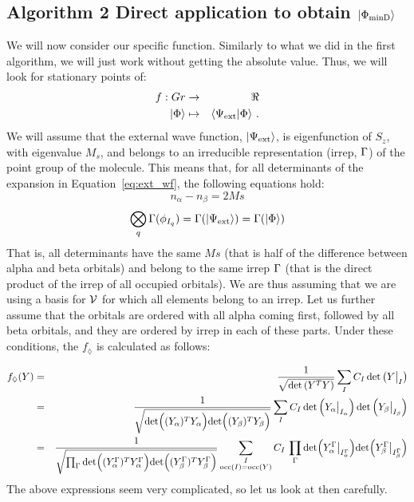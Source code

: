 \subsection{\textsf{\LARGE Algorithm 2}
  Direct application to obtain $\ket{\Phi_\text{minD}}$}
\label{sec:alg_two}

We will now consider our specific function.
Similarly to what we did in the first algorithm, we will just work without getting the absolute value.
Thus, we will look for stationary points of:
\begin{eqnarray}
  f : Gr &\to& \real\\
  \ket{\Phi} &\mapsto& \innerproduct{\Psi_\text{ext}}{\Phi}\,.
\end{eqnarray}
We will assume that the external wave function, $\ket{\Psi_\text{ext}}$, is eigenfunction of $S_z$, with eigenvalue $M_s$, and belongs to an irreducible representation (irrep, $\Gamma$) of the point group of the molecule.
This means that, for all determinants of the expansion in Equation~\eqref{eq:ext_wf}, the following equations hold:
\begin{equation}
  n_\alpha - n_\beta = 2 Ms
\end{equation}
\begin{equation}\label{eq:irrep_condition}
  \bigotimes_q \Gamma(\phi_{I_q}) = \Gamma(\ket{\Psi_\text{ext}}) = \Gamma(\ket{\Phi})
\end{equation}
That is, all determinants have the same $Ms$ (that is half of the difference between alpha and beta orbitals) and belong to the same irrep $\Gamma$ (that is the direct product of the irrep of all occupied orbitals).
We are thus assuming that we are using a basis for $\mathcal{V}{}$ for which all elements belong to an irrep.
Let us further assume that the orbitals are ordered with all alpha coming first, followed by all beta orbitals, and they are ordered by irrep in each of these parts.
Under these conditions, the $f_\lozenge$ is calculated as follows:

\begin{eqnarray}
  \label{eq:gen_f}
  f_\lozenge(Y)
  &=& \frac{1}{\sqrt{\text{det} \left( Y^T Y \right)}}
      \sum_{I} C_I \, \text{det} \left( Y\big|_I \right)\\
  &=& \frac{1}{\sqrt{
      \text{det} \Big( (Y_\alpha)^T Y_\alpha \Big)
      \text{det} \Big( (Y_\beta)^T Y_\beta \Big)
      }}
      \sum_{I} C_I \,
      \text{det} \left( Y_\alpha\big|_{I_\alpha} \right)
      \text{det} \left( Y_\beta\big|_{I_\beta} \right)\\\label{eq:f_diam_spin_irrep}
  &=& \frac{1}{\sqrt{
      \prod_{\Gamma}
      \text{det} \Big( (Y_\alpha^{\Gamma})^T Y_\alpha^{\Gamma} \Big)
      \text{det} \Big( (Y_\beta^{\Gamma})^T Y_\beta^{\Gamma} \Big)
      }}
      \sum_{\substack{I\\\text{occ}(I) = \text{occ}(Y)}} C_I \,
  \prod_{\Gamma}
  \text{det} \Big( Y_\alpha^{\Gamma}\big|_{I_\alpha^{\Gamma}} \Big)
  \text{det} \Big( Y_\beta^{\Gamma}\big|_{I_\beta^{\Gamma}} \Big)
\end{eqnarray}
The above expressions seem very complicated, so let us look at then carefully.


